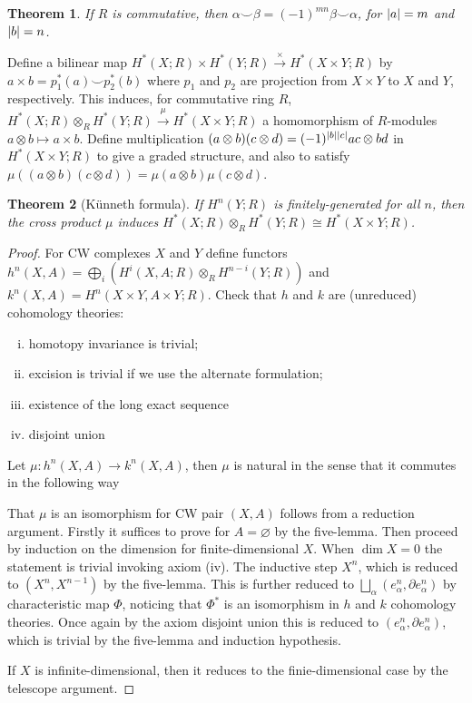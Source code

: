 \documentclass[11pt]{article}
\theoremstyle{definition}
\theoremstyle{plain}
\newtheorem{theorem}{Theorem}[section]
\newcommand{\1}{\mathbf{1}}
\begin{document}
\begin{theorem}
If $R$ is commutative, then $\alpha\smile\beta=(-1)^{mn}\beta\smile\alpha$, for $\abs{a}=m$ and $\abs{b}=n$.
\end{theorem}

Define a bilinear map $H^\ast(X;R)\times H^\ast(Y;R)\xrightarrow{\times}H^\ast(X\times Y;R)$ by $a\times b=p_1^\ast(a)\smile p_2^\ast(b)$ where $p_1$ and $p_2$ are projection from $X\times Y$ to $X$ and $Y$, respectively. This induces, for commutative ring $R$, $H^\ast(X;R)\otimes_RH^\ast(Y;R)\xrightarrow{\mu}H^\ast(X\times Y;R)$ a homomorphism of $R$-modules $a\otimes b\mapsto a\times b$. Define multiplication $(a\otimes b)(c\otimes d)=(-1)^{\abs{b}\abs{c}}ac\otimes bd$ in $H^\ast(X\times Y;R)$ to give a graded structure, and also to satisfy $\mu((a\otimes b)(c\otimes d))=\mu(a\otimes b)\mu(c\otimes d)$.

\begin{theorem}[Künneth formula]
If $H^n(Y;R)$ is finitely-generated for all $n$, then the cross product $\mu$ induces $H^\ast(X;R)\otimes_RH^\ast(Y;R)\cong H^\ast(X\times Y;R)$.
\end{theorem}
\begin{proof}
For CW complexes $X$ and $Y$ define functors $h^n(X,A)=\bigoplus_i(H^i(X,A;R)\otimes_RH^{n-i}(Y;R))$ and $k^n(X,A)=H^n(X\times Y,A\times Y;R)$. Check that $h$ and $k$ are (unreduced) cohomology theories:\begin{enumerate}[(i)]
    \item homotopy invariance is trivial;
    \item excision is trivial if we use the alternate formulation;
    \item existence of the long exact sequence
    \item disjoint union
\end{enumerate}

Let $\mu:h^n(X,A)\to k^n(X,A)$, then $\mu$ is natural in the sense that it commutes in the following way\medbreak

That $\mu$ is an isomorphism for CW pair $(X,A)$ follows from a reduction argument. Firstly it suffices to prove for $A=\varnothing$ by the five-lemma. Then proceed by induction on the dimension for finite-dimensional $X$. When $\dim X=0$ the statement is trivial invoking axiom (iv). The inductive step $X^n$, which is reduced to $(X^n,X^{n-1})$ by the five-lemma. This is further reduced to $\bigsqcup_\alpha(e_\alpha^n,\partial e^n_\alpha)$ by characteristic map $\Phi$, noticing that $\Phi^\ast$ is an isomorphism in $h$ and $k$ cohomology theories. Once again by the axiom disjoint union this is reduced to $(e_\alpha^n,\partial e^n_\alpha)$, which is trivial by the five-lemma and induction hypothesis.\medbreak

If $X$ is infinite-dimensional, then it reduces to the finie-dimensional case by the telescope argument.


\end{proof}
\end{document}
